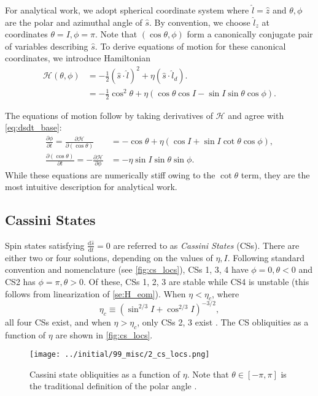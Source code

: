 \documentclass[
        fleqn,
        usenatbib,
    ]{mnras}
\newcommand*{\rd}[2]{\frac{\mathrm{d}#1}{\mathrm{d}#2}}
\newcommand*{\pd}[2]{\frac{\partial#1}{\partial#2}}
\newcommand*{\p}[1]{\left(#1\right)}
\begin{document}
For analytical work, we adopt spherical coordinate system where $\hat{l} =
\hat{z}$ and $\theta, \phi$ are the polar and azimuthal angle of $\hat{s}$. By
convention, we choose $\hat{l}_z$ at coordinates $\theta = I, \phi = \pi$.
Note that $\p{\cos \theta, \phi}$ form a canonically conjugate pair of variables
describing $\hat{s}$. To derive equations of motion for these canonical
coordinates, we introduce Hamiltonian
\begin{align}
    \mathcal{H}\p{\theta, \phi} &= -\frac{1}{2}\p{\hat{s} \cdot \hat{l}}^2
            + \eta \p{\hat{s} \cdot \hat{l}_d}.\label{eq:H}\\
        &= -\frac{1}{2}\cos^2\theta
            + \eta \p{\cos \theta \cos I - \sin I \sin \theta \cos \phi}.
\end{align}

The equations of motion follow by taking derivatives of $\mathcal{H}$ and agree
with \autoref{eq:dsdt_base}:
\begin{subequations}\label{se:H_eom}
    \begin{align}
        \pd{\phi}{t} = \pd{\mathcal{H}}{(\cos\theta)}
            &= -\cos\theta + \eta\p{\cos I + \sin I \cot \theta \cos \phi},\\
        \pd{(\cos \theta)}{t} = -\pd{\mathcal{H}}{\phi}
            &= -\eta \sin I \sin \theta \sin \phi.
    \end{align}
\end{subequations}
While these equations are numerically stiff owing to the $\cot\theta$ term, they
are the most intuitive description for analytical work.

\subsection{Cassini States}\label{ss:cs}

Spin states satisfying $\rd{\hat{s}}{t} = 0$ are referred to as \emph{Cassini
States} (CSs). There are either two or four solutions, depending on the values
of $\eta, I$. Following standard convention and nomenclature (see
\autoref{fig:cs_locs}), CSs 1, 3, 4 have $\phi = 0, \theta < 0$ and CS2 has
$\phi = \pi, \theta > 0$. Of these, CSs 1, 2, 3 are stable while CS4 is unstable
(this follows from linearization of \autoref{se:H_eom}). When $\eta < \eta_c$,
where
\begin{equation}
    \eta_c \equiv \p{\sin^{2/3}I + \cos^{2/3}I}^{-3/2},
\end{equation}
all four CSs exist, and when $\eta > \eta_c$, only CSs 2, 3 exist
\citep{henrard1987,ward2004I}. The CS obliquities as a function of $\eta$ are
shown in \autoref{fig:cs_locs}.
\begin{figure}
    \centering
    \texttt{[image: ../initial/99\_misc/2\_cs\_locs.png]}
    \caption{Cassini state obliquities as a function of $\eta$. Note that
    $\theta \in [-\pi, \pi]$ is the traditional definition of the polar angle
    \citep[see e.g.][]{colombo1966,peale1969,henrard1987}.}\label{fig:cs_locs}
\end{figure}
\end{document}
